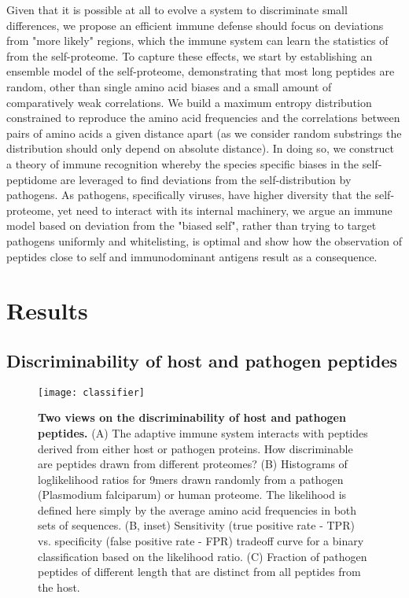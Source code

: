 \documentclass[superscriptaddress,twocolumn,pre]{revtex4}
\newcommand{\<}{\langle}
\renewcommand{\>}{\rangle}
\begin{document}
Given that it is possible at all to evolve a system to discriminate small differences, we propose an efficient immune defense should focus on deviations from "more likely" regions, which the immune system can learn the statistics of from the self-proteome. To capture these effects, we start by establishing an ensemble model of the self-proteome, demonstrating that most long peptides are random, other than single amino acid biases and a small amount of comparatively weak correlations. We build a maximum entropy distribution constrained to reproduce the amino acid frequencies and the correlations between pairs of amino acids a given distance apart (as we consider random substrings the distribution should only depend on absolute distance).  In doing so, we construct a theory of immune recognition whereby the species specific biases in the self-peptidome are leveraged to find deviations from the self-distribution by pathogens. As pathogens, specifically viruses, have higher diversity that the self-proteome, yet need to interact with its internal machinery, we argue an immune model based on deviation from the "biased self", rather than trying to target pathogens uniformly and whitelisting, is optimal and show how the observation of peptides close to self and immunodominant antigens result as a consequence. 

\section{Results}

\subsection{Discriminability of host and pathogen peptides}


\begin{figure}
    \texttt{[image: classifier]}
        \caption{{\bf Two views on the discriminability of host and pathogen peptides.} (A) The adaptive immune system interacts with peptides derived from either host or pathogen proteins. How discriminable are peptides drawn from different proteomes? (B) Histograms of loglikelihood ratios for 9mers drawn randomly from a pathogen (Plasmodium falciparum) or human proteome. The likelihood is defined here simply by the average amino acid frequencies in both sets of sequences. (B, inset) Sensitivity (true positive rate - TPR) vs. specificity (false positive rate - FPR) tradeoff curve for a binary classification based on the likelihood ratio. (C) Fraction of pathogen peptides of different length that are distinct from all peptides from the host.
    \label{figclassifier}
    }
\end{figure}
\end{document}
